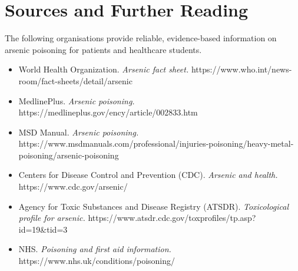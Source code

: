 \section*{Sources and Further Reading}
The following organisations provide reliable, evidence-based information on arsenic poisoning for patients and healthcare students.

\begin{itemize}
    \item World Health Organization. \textit{Arsenic fact sheet.} https://www.who.int/news-room/fact-sheets/detail/arsenic
    \item MedlinePlus. \textit{Arsenic poisoning.} https://medlineplus.gov/ency/article/002833.htm
    \item MSD Manual. \textit{Arsenic poisoning.} https://www.msdmanuals.com/professional/injuries-poisoning/heavy-metal-poisoning/arsenic-poisoning
    \item Centers for Disease Control and Prevention (CDC). \textit{Arsenic and health.} https://www.cdc.gov/arsenic/
    \item Agency for Toxic Substances and Disease Registry (ATSDR). \textit{Toxicological profile for arsenic.} https://www.atsdr.cdc.gov/toxprofiles/tp.asp?id=19\&tid=3
    \item NHS. \textit{Poisoning and first aid information.} https://www.nhs.uk/conditions/poisoning/
\end{itemize}
